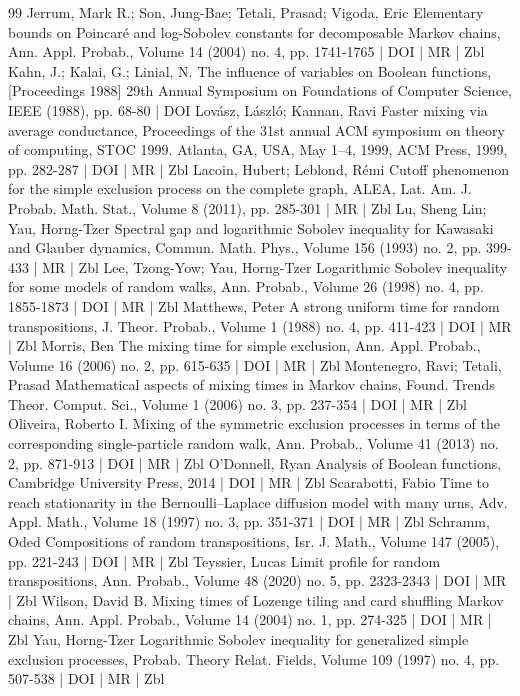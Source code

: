 \begin{thebibliography}{99}
Jerrum, Mark R.; Son, Jung-Bae; Tetali, Prasad; Vigoda, Eric Elementary bounds on Poincaré and log-Sobolev constants for decomposable Markov chains, Ann. Appl. Probab., Volume 14 (2004) no. 4, pp. 1741-1765 | DOI | MR | Zbl
Kahn, J.; Kalai, G.; Linial, N. The influence of variables on Boolean functions, [Proceedings 1988] 29th Annual Symposium on Foundations of Computer Science, IEEE (1988), pp. 68-80 | DOI
Lovász, László; Kannan, Ravi Faster mixing via average conductance, Proceedings of the 31st annual ACM symposium on theory of computing, STOC 1999. Atlanta, GA, USA, May 1–4, 1999, ACM Press, 1999, pp. 282-287 | DOI | MR | Zbl
Lacoin, Hubert; Leblond, Rémi Cutoff phenomenon for the simple exclusion process on the complete graph, ALEA, Lat. Am. J. Probab. Math. Stat., Volume 8 (2011), pp. 285-301 | MR | Zbl
Lu, Sheng Lin; Yau, Horng-Tzer Spectral gap and logarithmic Sobolev inequality for Kawasaki and Glauber dynamics, Commun. Math. Phys., Volume 156 (1993) no. 2, pp. 399-433 | MR | Zbl
Lee, Tzong-Yow; Yau, Horng-Tzer Logarithmic Sobolev inequality for some models of random walks, Ann. Probab., Volume 26 (1998) no. 4, pp. 1855-1873 | DOI | MR | Zbl
Matthews, Peter A strong uniform time for random transpositions, J. Theor. Probab., Volume 1 (1988) no. 4, pp. 411-423 | DOI | MR | Zbl
Morris, Ben The mixing time for simple exclusion, Ann. Appl. Probab., Volume 16 (2006) no. 2, pp. 615-635 | DOI | MR | Zbl
Montenegro, Ravi; Tetali, Prasad Mathematical aspects of mixing times in Markov chains, Found. Trends Theor. Comput. Sci., Volume 1 (2006) no. 3, pp. 237-354 | DOI | MR | Zbl
Oliveira, Roberto I. Mixing of the symmetric exclusion processes in terms of the corresponding single-particle random walk, Ann. Probab., Volume 41 (2013) no. 2, pp. 871-913 | DOI | MR | Zbl
O’Donnell, Ryan Analysis of Boolean functions, Cambridge University Press, 2014 | DOI | MR | Zbl
Scarabotti, Fabio Time to reach stationarity in the Bernoulli–Laplace diffusion model with many urns, Adv. Appl. Math., Volume 18 (1997) no. 3, pp. 351-371 | DOI | MR | Zbl
Schramm, Oded Compositions of random transpositions, Isr. J. Math., Volume 147 (2005), pp. 221-243 | DOI | MR | Zbl
Teyssier, Lucas Limit profile for random transpositions, Ann. Probab., Volume 48 (2020) no. 5, pp. 2323-2343 | DOI | MR | Zbl
Wilson, David B. Mixing times of Lozenge tiling and card shuffling Markov chains, Ann. Appl. Probab., Volume 14 (2004) no. 1, pp. 274-325 | DOI | MR | Zbl
Yau, Horng-Tzer Logarithmic Sobolev inequality for generalized simple exclusion processes, Probab. Theory Relat. Fields, Volume 109 (1997) no. 4, pp. 507-538 | DOI | MR | Zbl
\end{thebibliography}

